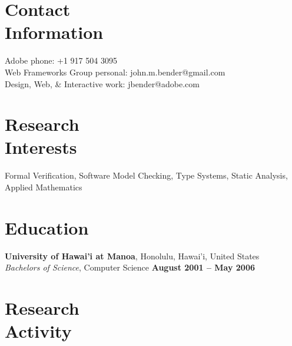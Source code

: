 \documentclass[margin,line]{resume}
\begin{document}
\begin{resume}

    \section{\mysidestyle Contact\\Information}

    Adobe                            \hfill phone: +1 917 504 3095           \vspace{0mm}\\\vspace{0mm}%
    Web Frameworks Group                          \hfill personal: john.m.bender@gmail.com          \vspace{0mm}\\\vspace{0mm}%
    Design, Web, \& Interactive                          \hfill work: jbender@adobe.com          \vspace{0mm}\\\vspace{0mm}%


    \section{\mysidestyle Research\\Interests}

    Formal Verification, Software Model Checking, Type Systems, Static Analysis, Applied Mathematics


    \section{\mysidestyle Education}

    \textbf{University of Hawai'i at Manoa}, Honolulu, Hawai'i, United States \vspace{2mm}\\\vspace{1mm}%
    \textsl{Bachelors of Science}, Computer Science \hfill \textbf{ August 2001 -- May 2006}\vspace{-3mm}\\\vspace{-1mm}%


    \section{\mysidestyle Research\\Activity}


\end{resume}
\end{document}
